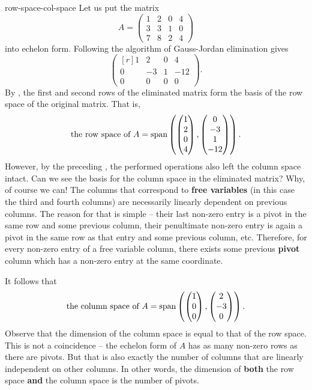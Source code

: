 \begin{example}{}{row-space-col-space}
 Let us put the matrix
 \[
  A = \begin{pmatrix}
  1 & 2 & 0 & 4\\
  3 & 3 & 1 & 0\\
  7 & 8 & 2 & 4
  \end{pmatrix}
 \]
 into echelon form. Following the algorithm of Gauss-Jordan elimination gives
 \[
  \begin{pmatrix*}[r]
   1 & 2 & 0 & 4\\
   0 & -3 & 1 & -12\\
   0 & 0 & 0 & 0
  \end{pmatrix*}.
 \]
 By , the first and second rows of the
 eliminated matrix form the basis of the row space of the original matrix. That
 is,
 \[
  \text{the row space of } A = \operatorname{span} \left( 
  \begin{pmatrix}
   1\\
   2\\
   0\\
   4
  \end{pmatrix},
  \begin{pmatrix}
   0\\
   -3\\
   1\\
   -12
  \end{pmatrix}
  \right).
 \]
 However, by the preceding , the
 performed operations also left the column space intact. Can we see the basis
 for the column space in the eliminated matrix? Why, of course we can! The
 columns that correspond to \textbf{free variables} (in this case the third and
 fourth columns) are necessarily linearly dependent on previous columns. The
 reason for that is simple -- their last non-zero entry is a pivot in the same
 row and some previous column, their penultimate non-zero entry is again a pivot
 in the same row as that entry and some previous column, etc. Therefore, for
 every non-zero entry of a free variable column, there exists some previous
 \textbf{pivot} column which has a non-zero entry at the same coordinate.

 It follows that
 \[
  \text{the column space of } A = \operatorname{span} \left(
   \begin{pmatrix}
    1\\
    0\\
    0
   \end{pmatrix},
   \begin{pmatrix}
    2\\
    -3\\
    0
   \end{pmatrix}
  \right).
 \]
 Observe that the dimension of the column space is equal to that of the row
 space. This is not a coincidence -- the echelon form of $A$ has as many
 non-zero rows as there are pivots. But that is also exactly the number of
 columns that are linearly independent on other columns. In other words, the
 dimension of \textbf{both} the row space \textbf{and} the column space is the
 number of pivots.
\end{example}


